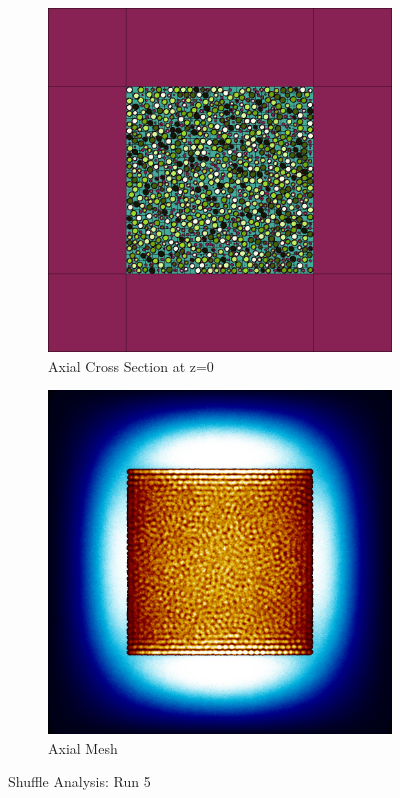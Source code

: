 \begin{figure}[H]
\begin{subfigure}{0.45\textwidth}
  \includegraphics[width=0.95\linewidth]{figures/5601234/5601234-v}
  \caption{Axial Cross Section at z=0 }
  \label{fig:5601234-v}
\end{subfigure}
%
\begin{subfigure}{0.45\textwidth}
  \includegraphics[width=0.95\linewidth]{figures/5601234/5601234-vm}
  \caption{Axial Mesh}
  \label{fig:5601234-vm}
\end{subfigure}
%
\caption{Shuffle Analysis: Run 5}
\label{fig:0-60}
\end{figure}